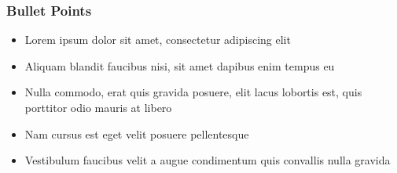 \documentclass[aspectratio=169]{beamer}
\begin{document}




\begin{frame}
\frametitle{Bullet Points}
\begin{itemize}
\item Lorem ipsum dolor sit amet, consectetur adipiscing elit
\item Aliquam blandit faucibus nisi, sit amet dapibus enim tempus eu
\item Nulla commodo, erat quis gravida posuere, elit lacus lobortis est, quis porttitor odio mauris at libero
\item Nam cursus est eget velit posuere pellentesque
\item Vestibulum faucibus velit a augue condimentum quis convallis nulla gravida
\end{itemize}
\end{frame}
\end{document}
